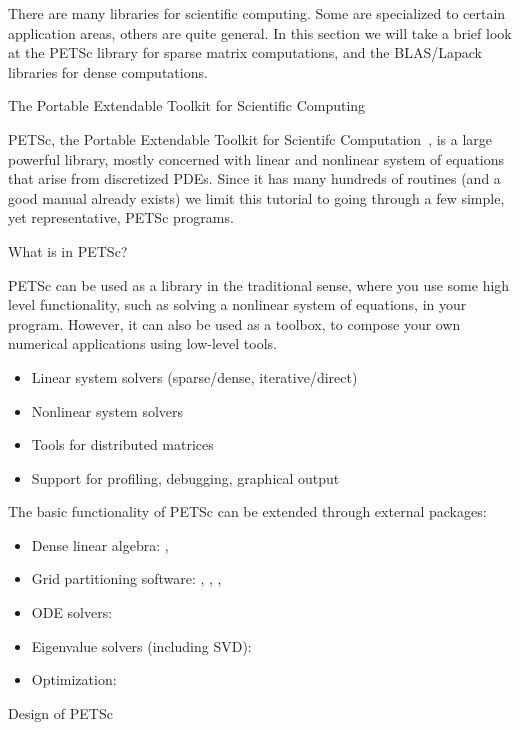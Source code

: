 
There are many libraries for scientific computing. Some are
specialized to certain application areas, others are quite general. In
this section we will take a brief look at the PETSc library for sparse
matrix computations, and the BLAS/Lapack libraries for dense
computations.

 {The Portable Extendable Toolkit for Scientific
  Computing}

PETSc, the Portable Extendable Toolkit for Scientifc
Computation~\cite{}, is a large powerful library, mostly concerned
with linear and nonlinear system of equations that arise from
discretized \acp{PDE}. Since it has many hundreds of routines (and a
good manual already exists) we limit this tutorial to going through
a few simple, yet representative, PETSc programs.

 {What is in PETSc?}

PETSc can be used as a library in the traditional sense, where you use
some high level functionality, such as solving a nonlinear system of
equations, in your program. However, it can also be used as a toolbox,
to compose your own numerical applications using low-level tools.

  \begin{itemize}
  \item Linear system solvers (sparse/dense, iterative/direct)
  \item Nonlinear system solvers
  \item Tools for distributed matrices
  \item Support for profiling, debugging, graphical output
  \end{itemize}

The basic functionality of PETSc can be extended through external
packages:

  \begin{itemize}
  \item Dense linear algebra: , 
  \item Grid partitioning software: , , , 
  \item ODE solvers: 
  \item Eigenvalue solvers (including SVD): 
  \item Optimization: 
  \end{itemize}

 {Design of PETSc}

